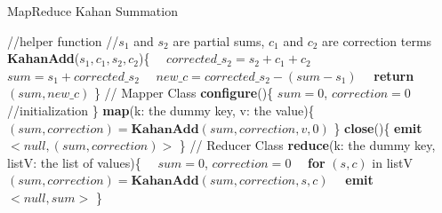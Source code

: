 \begin{algorithm}
\caption{MapReduce Kahan Summation} 
\label{algo:mrkahan}
\begin{algorithmic}
\small{
\STATE //helper function
\STATE //$s_1$ and $s_2$ are partial sums, $c_1$ and $c_2$ are correction terms
\STATE \textbf{KahanAdd}($s_1, c_1, s_2, c_2$)\{
\STATE \ \ $corrected\_s_2 = s_2 + c_1+c_2$
\STATE \ \ $sum=s_1+corrected\_s_2$
\STATE \ \ $new\_c=corrected\_s_2-(sum - s_1)$
\STATE \ \ \textbf{return} $(sum, new\_c)$ \}
\STATE 
\STATE // Mapper Class
\STATE \textbf{configure}()\{ $sum=0$, $correction=0$ //initialization \}
\STATE \textbf{map}(k: the dummy key, v: the value)\{
\STATE \ \ $(sum, correction)=\textbf{KahanAdd}(sum, correction, v, 0)$ \}
\STATE \textbf{close}()\{ \textbf{emit} $<null, (sum, correction)>$ \}
\STATE 
\STATE // Reducer Class
\STATE \textbf{reduce}(k: the dummy key, listV: the list of values)\{
\STATE \ \ $sum=0$, $correction=0$
\STATE \ \ \textbf{for} $(s, c)$ in  listV 
\STATE \ \ \ \ $(sum, correction)=\textbf{KahanAdd}(sum, correction, s, c)$
\STATE \ \ \textbf{emit} $<null, sum>$ \}
}
\end{algorithmic}
\end{algorithm}
